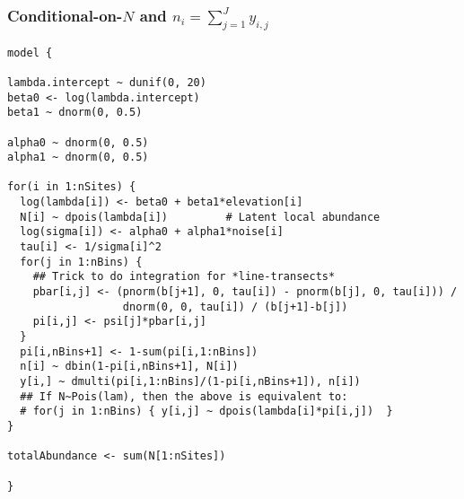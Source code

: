 \documentclass[color=usenames,dvipsnames]{beamer}\usepackage[]{graphicx}\usepackage[]{color}
\makeatletter
\newenvironment{kframe}{%
 \def\at@end@of@kframe{}%
 \ifinner\ifhmode%
  \def\at@end@of@kframe{\end{minipage}}%
  \begin{minipage}{\columnwidth}%
 \fi\fi%
 \def\FrameCommand##1{\hskip\@totalleftmargin \hskip-\fboxsep
 \colorbox{shadecolor}{##1}\hskip-\fboxsep
     \hskip-\linewidth \hskip-\@totalleftmargin \hskip\columnwidth}%
 \MakeFramed {\advance\hsize-\width
   \@totalleftmargin\z@ \linewidth\hsize
   \@setminipage}}%
 {\par\unskip\endMakeFramed%
 \at@end@of@kframe}
\newenvironment{knitrout}{}{} %
\makeatother
\begin{document}
\begin{frame}[fragile]
  \frametitle{\normalsize Conditional-on-$N$ and $n_i=\sum_{j=1}^{J} y_{i,j}$}
\vspace{-3pt}
\begin{knitrout}\tiny
{}\color{fgcolor}\begin{kframe}
\begin{verbatim}
model {

lambda.intercept ~ dunif(0, 20)
beta0 <- log(lambda.intercept)
beta1 ~ dnorm(0, 0.5)

alpha0 ~ dnorm(0, 0.5)
alpha1 ~ dnorm(0, 0.5)

for(i in 1:nSites) {
  log(lambda[i]) <- beta0 + beta1*elevation[i]
  N[i] ~ dpois(lambda[i])         # Latent local abundance
  log(sigma[i]) <- alpha0 + alpha1*noise[i]
  tau[i] <- 1/sigma[i]^2
  for(j in 1:nBins) {
    ## Trick to do integration for *line-transects*
    pbar[i,j] <- (pnorm(b[j+1], 0, tau[i]) - pnorm(b[j], 0, tau[i])) /
                  dnorm(0, 0, tau[i]) / (b[j+1]-b[j])
    pi[i,j] <- psi[j]*pbar[i,j]
  }
  pi[i,nBins+1] <- 1-sum(pi[i,1:nBins])
  n[i] ~ dbin(1-pi[i,nBins+1], N[i])
  y[i,] ~ dmulti(pi[i,1:nBins]/(1-pi[i,nBins+1]), n[i])
  ## If N~Pois(lam), then the above is equivalent to:
  # for(j in 1:nBins) { y[i,j] ~ dpois(lambda[i]*pi[i,j])  }
}

totalAbundance <- sum(N[1:nSites])

}
\end{verbatim}
\end{kframe}
\end{knitrout}
\end{frame}
\end{document}
